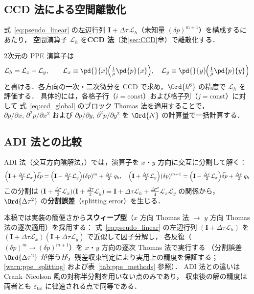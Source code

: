 \subsection{CCD 法による空間離散化}
\label{sec:pseudo_ccd_discretization}

式~\eqref{eq:pseudo_linear} の左辺行列 $\mathbf{I} + \Delta\tau\,\mathcal{L}_h$（未知量 $(\delta p)^{m+1}$）を構成するにあたり，
空間演算子 $\mathcal{L}_h$ を\textbf{CCD 法}（第\ref{sec:CCD}章）で離散化する．

2次元の PPE 演算子は
\begin{equation}
  \mathcal{L}_h = \mathcal{L}_x + \mathcal{L}_y,
  \qquad
  \mathcal{L}_x \equiv \pd{}{x}\!\Bigl(\tfrac{1}{\rho}\pd{p}{x}\Bigr),\quad
  \mathcal{L}_y \equiv \pd{}{y}\!\Bigl(\tfrac{1}{\rho}\pd{p}{y}\Bigr)
  \label{eq:L_split}
\end{equation}
と書ける．各方向の一次・二次微分を CCD で求め，$\Ord{h^6}$ の精度で $\mathcal{L}_h$ を評価する．
具体的には，各格子行（$i=$const）および格子列（$j=$const）に対して
式~\eqref{eq:ccd_global} のブロック Thomas 法を適用することで，
$\partial p/\partial x,\,\partial^2 p/\partial x^2$ および $\partial p/\partial y,\,\partial^2 p/\partial y^2$ を
$\Ord{N}$ の計算量で一括計算する．

\subsection{ADI 法との比較}
\label{sec:pseudo_adi_comparison}

ADI 法（交互方向陰解法，\cite{PeacemanRachford1955}）では，演算子を $x$・$y$ 方向に交互に分割して解く：
\begin{equation}
  \Bigl(\mathbf{I} + \tfrac{\Delta\tau}{2}\mathcal{L}_x\Bigr)\widetilde{\delta p}
  = \Bigl(\mathbf{I} - \tfrac{\Delta\tau}{2}\mathcal{L}_y\Bigr)(\delta p)^m + \tfrac{\Delta\tau}{2}\, q_h,
  \quad
  \Bigl(\mathbf{I} + \tfrac{\Delta\tau}{2}\mathcal{L}_y\Bigr)(\delta p)^{m+1}
  = \Bigl(\mathbf{I} - \tfrac{\Delta\tau}{2}\mathcal{L}_x\Bigr)\widetilde{\delta p} + \tfrac{\Delta\tau}{2}\, q_h
  \label{eq:ADI}
\end{equation}
この分割は
$
  \bigl(\mathbf{I}+\tfrac{\Delta\tau}{2}\mathcal{L}_x\bigr)
  \bigl(\mathbf{I}+\tfrac{\Delta\tau}{2}\mathcal{L}_y\bigr)
  = \mathbf{I} + \Delta\tau\mathcal{L}_h + \tfrac{\Delta\tau^2}{4}\mathcal{L}_x\mathcal{L}_y
$
の関係から，$\Ord{\Delta\tau^2}$ の\textbf{分割誤差}（splitting error）を生じる．

本稿では実装の簡便さから\textbf{スウィープ型}（$x$ 方向 Thomas 法 $\to$ $y$ 方向 Thomas 法の逐次適用）を採用する：
式~\eqref{eq:pseudo_linear} の左辺行列 $(\mathbf{I}+\Delta\tau\mathcal{L}_h)$ を
$(\mathbf{I}+\Delta\tau\mathcal{L}_x)(\mathbf{I}+\Delta\tau\mathcal{L}_y)$ で近似して因子分解し，
各反復（$(\delta p)^m \to (\delta p)^{m+1}$）を $x$・$y$ 方向の逐次 Thomas 法で実行する
（分割誤差 $\Ord{\Delta\tau^2}$ が伴うが，残差収束判定により実用上の精度を保証する；
\ref{warn:ppe_splitting} および表~\ref{tab:ppe_methods} 参照）．
ADI 法との違いは Crank--Nicolson 風の対称半分割を用いない点のみであり，
収束後の解の精度は両者とも $\varepsilon_\text{tol}$ に律速される点で同等である．

